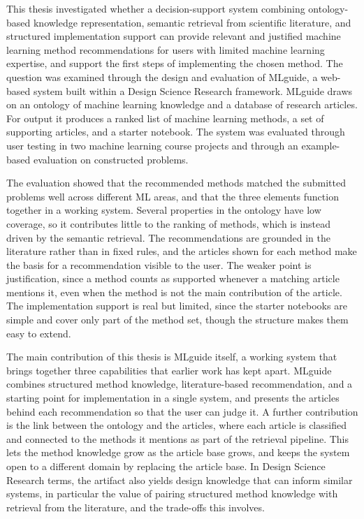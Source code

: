 This thesis investigated whether a decision-support system combining
ontology-based knowledge representation, semantic retrieval from
scientific literature, and structured implementation support can
provide relevant and justified machine learning method recommendations
for users with limited machine learning expertise,
and support the first steps of implementing the chosen method. 
The question was
examined through the design and evaluation of MLguide, a web-based
system built within a Design Science Research framework. 
MLguide draws on an ontology of machine learning knowledge and a database of 
research articles. For output it produces a ranked list of machine learning 
methods, a set of supporting articles, and a starter notebook. The system was evaluated
through user testing in two machine learning course projects and through an
example-based evaluation on constructed problems.

The evaluation showed that the recommended methods matched the
submitted problems well across different ML areas, and that the three
elements function together in a working system. Several properties in
the ontology have low coverage, so it contributes little to the
ranking of methods, which is instead driven by the semantic retrieval. The
recommendations are grounded in the literature rather than in fixed
rules, and the articles shown for each method make the basis for a
recommendation visible to the user. The weaker point is justification,
since a method counts as supported whenever a matching article
mentions it, even when the method is not the main contribution of the
article. The implementation support is real but limited, since the starter
notebooks are simple and cover only part of the method set, though
the structure makes them easy to extend.

The main contribution of this thesis is MLguide itself, a working
system that brings together three capabilities that earlier work has
kept apart. MLguide combines structured method
knowledge, literature-based recommendation, and a starting point for
implementation in a single system, and presents the articles behind
each recommendation so that the user can judge it. A further
contribution is the link between the ontology and the articles, where
each article is classified and connected to the methods it mentions as
part of the retrieval pipeline. This lets the method knowledge grow as
the article base grows, and keeps the system open to a different domain by
replacing the article base. In Design Science Research terms, the
artifact also yields design knowledge that can inform similar systems,
in particular the value of pairing structured method knowledge with
retrieval from the literature, and the trade-offs this involves.

